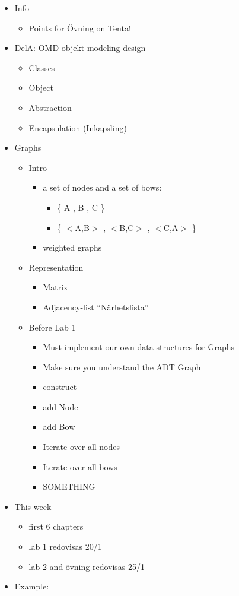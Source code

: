 \documentclass[11pt]{amsart}
\begin{document}
\begin{itemize}
\item Info
	\begin{itemize}
	\item Points for \"{O}vning on Tenta!
	\end{itemize}
\item DelA: OMD objekt-modeling-design
	\begin{itemize}
	\item Classes
	\item Object
	\item Abstraction
	\item Encapsulation (Inkapsling)
	\end{itemize}
\item Graphs
	\begin{itemize}
	\item Intro
		\begin{itemize}
		\item a set of nodes and a set of bows: 
			\begin{itemize}
			\item \{ A , B , C \}
			\item \{ $<$A,B$>$ , $<$B,C$>$ , $<$C,A$>$ \}
			\end{itemize}
		\item weighted graphs
		\end{itemize}
	
	
	\item Representation
		\begin{itemize}
		\item Matrix
		\item Adjacency-list ``N\"{a}rhetslista''
		\end{itemize}
	\item Before Lab 1
		\begin{itemize}
		\item Must implement our own data structures for Graphs
		\item Make sure you understand the ADT Graph
		\item construct
		\item add Node
		\item add Bow
		\item Iterate over all nodes
		\item Iterate over all bows
		\item SOMETHING
		\end{itemize}
	\end{itemize}
\item This week
	\begin{itemize}
	\item first 6 chapters
	\item lab 1 redovisas 20/1
	\item lab 2 and \"{o}vning redovisas 25/1
	\end{itemize}
\item Example:
\end{itemize}
\end{document}
